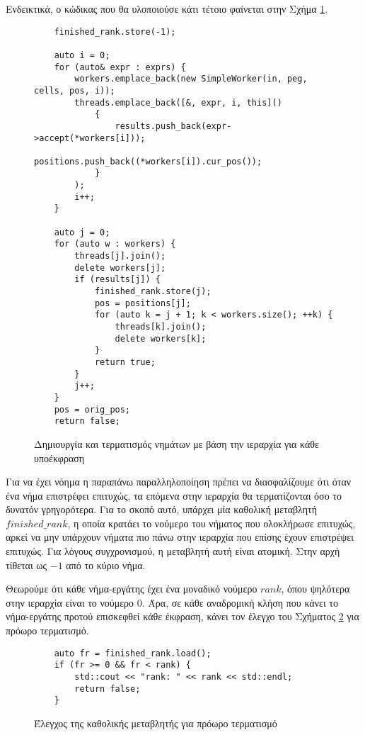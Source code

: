 Ενδεικτικά, ο κώδικας που θα υλοποιούσε κάτι τέτοιο φαίνεται στην Σχήμα \ref{fig:top_down_1}.

\begin{figure}[h]
\setlength\partopsep{-\topsep}%
\begin{verbatim}
    finished_rank.store(-1);

    auto i = 0;
    for (auto& expr : exprs) { 
        workers.emplace_back(new SimpleWorker(in, peg, cells, pos, i));
        threads.emplace_back([&, expr, i, this]()
            {
                results.push_back(expr->accept(*workers[i]));
                positions.push_back((*workers[i]).cur_pos());
            }
        );
        i++;
    }

    auto j = 0;
    for (auto w : workers) {
        threads[j].join(); 
        delete workers[j];
        if (results[j]) { 
            finished_rank.store(j);
            pos = positions[j];
            for (auto k = j + 1; k < workers.size(); ++k) {
                threads[k].join();
                delete workers[k];
            }
            return true;
        }
        j++;
    }
    pos = orig_pos;
    return false;
\end{verbatim}
\caption{Δημιουργία και τερματισμός νημάτων με βάση την ιεραρχία για κάθε υποέκφραση}
\label{fig:top_down_1}
\end{figure}

Για να έχει νόημα η παραπάνω παραλληλοποίηση πρέπει να διασφαλίζουμε ότι όταν ένα νήμα επιστρέφει επιτυχώς, τα επόμενα στην ιεραρχία θα τερματίζονται όσο το δυνατόν γρηγορότερα.
Για το σκοπό αυτό, υπάρχει μία καθολική μεταβλητή $finished\_rank$, η οποία κρατάει το νούμερο του νήματος που ολοκλήρωσε επιτυχώς, αρκεί να μην υπάρχουν νήματα πιο πάνω στην ιεραρχία που επίσης έχουν επιστρέψει επιτυχώς.
Για λόγους συγχρονισμού, η μεταβλητή αυτή είναι ατομική.
Στην αρχή τίθεται ως $-1$ από το κύριο νήμα.

Θεωρούμε ότι κάθε νήμα-εργάτης έχει ένα μοναδικό νούμερο $rank$, όπου ψηλότερα στην ιεραρχία είναι το νούμερο $0$.
Άρα, σε κάθε αναδρομική κλήση που κάνει το νήμα-εργάτης προτού επισκεφθεί κάθε έκφραση, κάνει τον έλεγχο του Σχήματος \ref{fig:top_down_2} για πρόωρο τερματισμό.

\begin{figure}[h]
\setlength\partopsep{-\topsep}%
\begin{verbatim}
    auto fr = finished_rank.load();
    if (fr >= 0 && fr < rank) { 
        std::cout << "rank: " << rank << std::endl;
        return false;
    }
\end{verbatim}
\caption{Έλεγχος της καθολικής μεταβλητής για πρόωρο τερματισμό}
\label{fig:top_down_2}
\end{figure}

